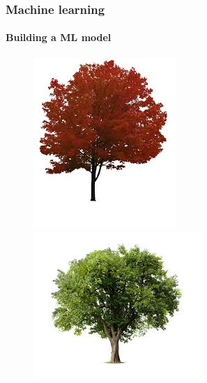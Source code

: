 \documentclass[aspectratio=43]{beamer}
\begin{document}
\begin{frame}

	\frametitle{Machine learning}
	\framesubtitle{Building a ML model}
	
	\begin{figure}
		\includegraphics[width = \linewidth]{plots/tree2.jpeg}
		\endminipage\hfill
		\includegraphics[width = \linewidth]{plots/tree1.jpeg}

\end{figure}
\end{frame}
\end{document}
